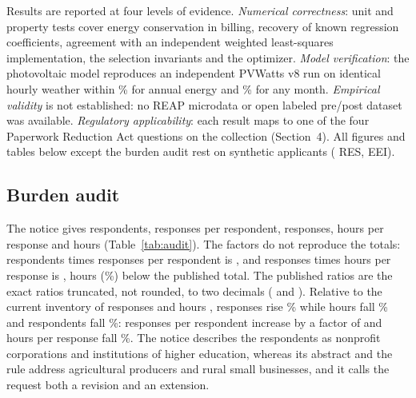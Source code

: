 \documentclass[preprint,12pt]{elsarticle}
\begin{document}
Results are reported at four levels of evidence. \emph{Numerical correctness}: unit and
property tests cover energy conservation in billing, recovery of known regression
coefficients, agreement with an independent weighted least-squares implementation, the
selection invariants and the optimizer. \emph{Model verification}: the photovoltaic
model reproduces an independent PVWatts v8 run on identical hourly weather within
\PvRefAnnualDiff\% for annual energy and \PvRefMonthlyMaxDiff\% for any month.
\emph{Empirical validity} is not established: no REAP microdata or open labeled
pre/post dataset was available. \emph{Regulatory applicability}: each result maps to
one of the four Paperwork Reduction Act questions on the collection (Section~4). All
figures and tables below except the burden audit rest on \NApplicants{} synthetic
applicants (\NRes{} RES, \NEei{} EEI).

\subsection{Burden audit}

The notice gives \AuditRespondents{} respondents, \AuditResponsesPerRespondent{}
responses per respondent, \AuditResponses{} responses, \AuditHoursPerResponse{} hours per
response and \AuditTotalHours{} hours (Table~\ref{tab:audit}). The factors do not
reproduce the totals: respondents times responses per respondent is
\AuditProductResponses, and responses times hours per response is \AuditProductHours,
\AuditHoursDiscrepancy{} hours (\AuditHoursDiscrepancyPct\%) below the published total.
The published ratios are the exact ratios truncated, not rounded, to two decimals
(\AuditImpliedResponsesPerRespondent{} and \AuditImpliedHoursPerResponse). Relative to
the current inventory of \InvResponses{} responses and \InvHours{} hours
\cite{omb05700067}, responses rise \ChangeResponsesPct\% while hours fall
\ChangeHoursPct\% and respondents fall \ChangeRespondentsPct\%: responses per respondent
increase by a factor of \ChangeResponsesPerRespondentFactor{} and hours per response fall
\ChangeHoursPerResponsePct\%. The notice describes the respondents as nonprofit
corporations and institutions of higher education, whereas its abstract and the rule
address agricultural producers and rural small businesses, and it calls the request both
a revision and an extension.

\begin{table}[t]
\caption{Arithmetic of the published burden estimate (91 FR 62611) and the current OMB
inventory. Observed regulatory data; no synthetic data.}\label{tab:audit}
\centering\footnotesize

\end{table}
\end{document}
